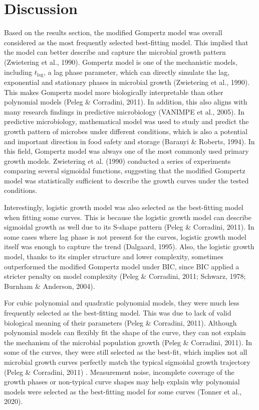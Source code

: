 \documentclass[11pt]{article}
\begin{document}
\section{Discussion}
Based on the results section, the modified Gompertz model was overall considered as the most frequently selected best-fitting model. This implied that the model can better describe and capture the microbial growth pattern (Zwietering et al., 1990). Gompertz model is one of the mechanistic models, including \(t_{\mathrm{lag}}\), a lag phase parameter, which can directly simulate the lag, exponential and stationary phases in microbial growth (Zwietering et al., 1990). This makes Gompertz model more biologically interpretable than other polynomial models (Peleg \& Corradini, 2011). In addition, this also aligns with many research findings in predictive microbiology (VANIMPE et al., 2005). In predictive microbiology, mathematical model was used to study and predict the growth pattern of microbes under different conditions, which is also a potential and important direction in food safety and storage (Baranyi \& Roberts, 1994). In this field, Gompertz model was always one of the most commonly used primary growth models. Zwietering et al. (1990)  conducted a series of experiments comparing several sigmoidal functions, suggesting that the modified Gompertz model was statistically sufficient to describe the growth curves under the tested conditions. 

Interestingly, logistic growth model was also selected as the best-fitting model when fitting some curves. This is because the logistic growth model can describe sigmoidal growth as well due to its S-shape pattern (Peleg \& Corradini, 2011). In some cases where lag phase is not present for the curves, logistic growth model itself was enough to capture the trend (Dalgaard, 1995). Also, the logistic growth model, thanks to its simpler structure and lower complexity, sometimes outperformed the modified Gompertz model under BIC, since BIC applied a stricter penalty on model complexity (Peleg \& Corradini, 2011; Schwarz, 1978; Burnham \& Anderson, 2004).

For cubic polynomial and quadratic polynomial models, they were much less frequently selected as the best-fitting model. This was due to lack of valid biological meaning of their parameters (Peleg \& Corradini, 2011). Although polynomial models can flexibly fit the shape of the curve, they can not explain the mechanism of the microbial population growth (Peleg \& Corradini, 2011). In some of the curves, they were still selected as the best-fit, which implies not all microbial growth curves perfectly match the typical sigmoidal growth trajectory (Peleg \& Corradini, 2011) . Measurement noise, incomplete coverage of the growth phases or non-typical curve shapes may help explain why polynomial models were selected as the best-fitting model for some curves (Tonner et al., 2020).
\end{document}
